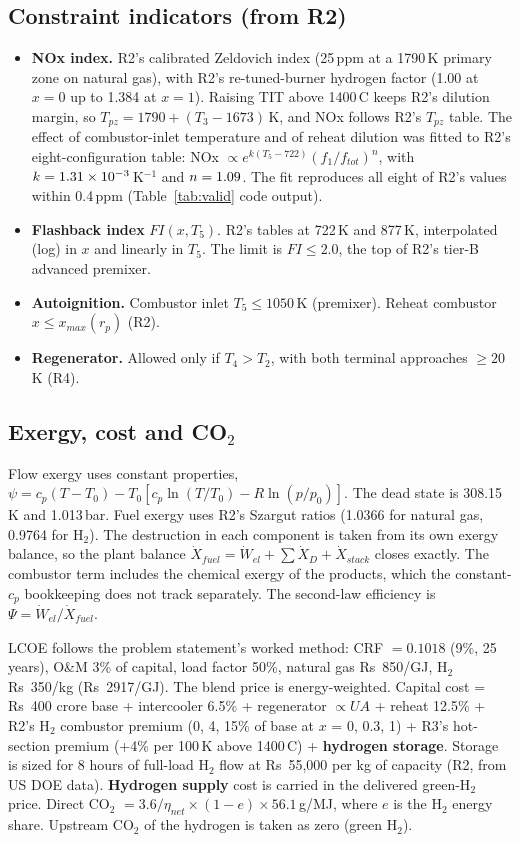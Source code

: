 \documentclass[10.5pt,a4paper]{article}
\newcommand{\Rs}{Rs~}
\begin{document}
\subsection{Constraint indicators (from R2)}
\begin{itemize}[leftmargin=1.2em,itemsep=1pt]
\item \textbf{NOx index.} R2's calibrated Zeldovich index (25\,ppm at a 1790\,K primary zone on natural gas), with R2's re-tuned-burner hydrogen factor (1.00 at $x=0$ up to 1.384 at $x=1$). Raising TIT above 1400\,\textdegree C keeps R2's dilution margin, so $T_{pz}=1790+(T_3-1673)$\,K, and NOx follows R2's $T_{pz}$ table. The effect of combustor-inlet temperature and of reheat dilution was fitted to R2's eight-configuration table: NOx $\propto e^{k(T_5-722)}(f_1/f_{tot})^n$, with $k=1.31\times10^{-3}$\,K$^{-1}$ and $n=1.09$. The fit reproduces all eight of R2's values within 0.4\,ppm (Table~\ref{tab:valid} code output).
\item \textbf{Flashback index} $FI(x,T_5)$. R2's tables at 722\,K and 877\,K, interpolated (log) in $x$ and linearly in $T_5$. The limit is $FI\le2.0$, the top of R2's tier-B advanced premixer.
\item \textbf{Autoignition.} Combustor inlet $T_5\le1050$\,K (premixer). Reheat combustor $x\le x_{max}(r_p)$ (R2).
\item \textbf{Regenerator.} Allowed only if $T_4>T_2$, with both terminal approaches $\ge20$\,K (R4).
\end{itemize}

\subsection{Exergy, cost and CO$_2$}
Flow exergy uses constant properties, $\psi=c_p(T-T_0)-T_0[c_p\ln(T/T_0)-R\ln(p/p_0)]$. The dead state is 308.15\,K and 1.013\,bar. Fuel exergy uses R2's Szargut ratios (1.0366 for natural gas, 0.9764 for H$_2$). The destruction in each component is taken from its own exergy balance, so the plant balance $\dot X_{fuel}=\dot W_{el}+\sum\dot X_D+\dot X_{stack}$ closes exactly. The combustor term includes the chemical exergy of the products, which the constant-$c_p$ bookkeeping does not track separately. The second-law efficiency is $\Psi=\dot W_{el}/\dot X_{fuel}$.

LCOE follows the problem statement's worked method: CRF $=0.1018$ (9\%, 25 years), O\&M 3\% of capital, load factor 50\%, natural gas \Rs850/GJ, H$_2$ \Rs350/kg (\Rs2917/GJ). The blend price is energy-weighted. Capital cost = \Rs400 crore base + intercooler 6.5\% + regenerator $\propto UA$ + reheat 12.5\% + R2's H$_2$ combustor premium (0, 4, 15\% of base at $x$ = 0, 0.3, 1) + R3's hot-section premium (+4\% per 100\,K above 1400\,\textdegree C) + \textbf{hydrogen storage}. Storage is sized for 8 hours of full-load H$_2$ flow at \Rs55,000 per kg of capacity (R2, from US DOE data). \textbf{Hydrogen supply} cost is carried in the delivered green-H$_2$ price. Direct CO$_2$ $=3.6/\eta_{net}\times(1-e)\times56.1$\,g/MJ, where $e$ is the H$_2$ energy share. Upstream CO$_2$ of the hydrogen is taken as zero (green H$_2$).
\end{document}
